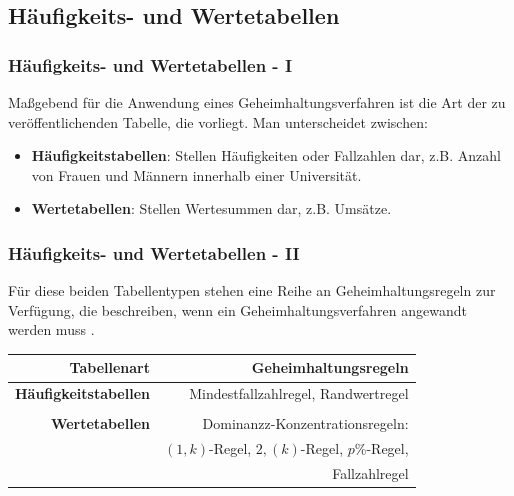 \documentclass[aspectratio=169]{beamer}
\begin{document}
\subsection{Häufigkeits- und Wertetabellen}

\begin{frame}
    \frametitle{Häufigkeits- und Wertetabellen - I}
    Maßgebend für die Anwendung eines Geheimhaltungsverfahren ist die Art der zu veröffentlichenden Tabelle, die vorliegt. Man unterscheidet zwischen:
    \begin{itemize}
        \item \textbf{Häufigkeitstabellen}: Stellen Häufigkeiten oder Fallzahlen dar, z.B. Anzahl von Frauen und Männern innerhalb einer Universität.
        \item \textbf{Wertetabellen}: Stellen Wertesummen dar, z.B. Umsätze.
    \end{itemize}
\end{frame}


\begin{frame}
    \frametitle{Häufigkeits- und Wertetabellen - II}
    Für diese beiden Tabellentypen stehen eine Reihe an Geheimhaltungsregeln zur Verfügung, die beschreiben, wenn ein Geheimhaltungsverfahren angewandt werden muss \cite{Nickl}.
    \begin{center}
        \begin{tabular}{ r r }
         \textbf{Tabellenart} \vline & \textbf{Geheimhaltungsregeln} \\ 
         \hline
         \textbf{Häufigkeitstabellen} \vline & Mindestfallzahlregel, Randwertregel \\  
         \vline & \\
         \hline
         \textbf{Wertetabellen} \vline & Dominanzz-Konzentrationsregeln:  \\
         \vline & $(1,k)$-Regel, $2,(k)$-Regel, $p$\%-Regel, \\
         \vline & Fallzahlregel
        \end{tabular}
    \end{center}
\end{frame}
\end{document}
